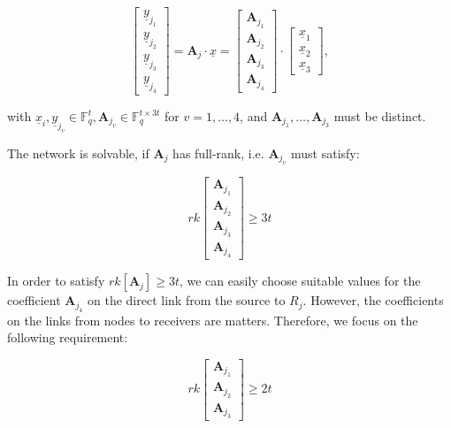 \[
\left[\begin{array}{c}
\underline{y}_{j_{1}}\\
\underline{y}_{j_{2}}\\
\underline{y}_{j_{3}}\\
\underline{y}_{j_{4}}
\end{array}\right]=\boldsymbol{A}_{j}\cdot\underline{x}=\left[\begin{array}{c}
\boldsymbol{A}_{j_{1}}\\
\boldsymbol{A}_{j_{2}}\\
\boldsymbol{A}_{j_{3}}\\
\boldsymbol{A}_{j_{4}}
\end{array}\right]\cdot\left[\begin{array}{c}
\underline{x}_{1}\\
\underline{x}_{2}\\
\underline{x}_{3}
\end{array}\right],
\]

with $\underline{x}_{i},\underline{y}_{j_{v}}\in\ensuremath{\mathbb{F}}_{q}^{t},\boldsymbol{A}_{j_{v}}\in\ensuremath{\mathbb{F}}_{q}^{t\times3t}$
for $v=1,\ldots,4$, and $\boldsymbol{A}_{j_{1}},\ldots,\boldsymbol{A}_{j_{3}}$
must be distinct.

The network is solvable, if $\boldsymbol{A}_{j}$ has full-rank, i.e.
$\boldsymbol{A}_{j_{v}}$ must satisfy:

\[
rk\left[\begin{array}{c}
\boldsymbol{A}_{j_{1}}\\
\boldsymbol{A}_{j_{2}}\\
\boldsymbol{A}_{j_{3}}\\
\boldsymbol{A}_{j_{4}}
\end{array}\right]\geq3t
\]

In order to satisfy $rk\left[\boldsymbol{A}_{j}\right]\geq3t$, we
can easily choose suitable values for the coefficient $\boldsymbol{A}_{j_{4}}$
on the direct link from the source to $R_{j}$. However, the coefficients
on the links from nodes to receivers are matters. Therefore, we focus
on the following requirement:

\begin{equation}
rk\left[\begin{array}{c}
\boldsymbol{A}_{j_{1}}\\
\boldsymbol{A}_{j_{2}}\\
\boldsymbol{A}_{j_{3}}
\end{array}\right]\geq2t\label{eq:rk_rqm_e1l1h3s4}
\end{equation}

